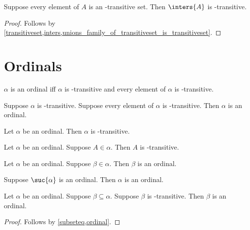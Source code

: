 \begin{proposition}\label{inters_family_of_transitiveset_is_transitiveset}
    Suppose every element of $A$ is an \in-transitive set.
    Then $\inters{A}$ is \in-transitive.
\end{proposition}
\begin{proof}
    Follows by \cref{transitiveset,inters,unions_family_of_transitiveset_is_transitiveset}.
\end{proof}


\section{Ordinals}

\begin{definition}\label{ordinal}
    $\alpha$ is an ordinal iff
    $\alpha$ is \in-transitive and
    every element of $\alpha$ is \in-transitive.
\end{definition}

\begin{proposition}\label{ordinal_intro}
    Suppose $\alpha$ is \in-transitive.
    Suppose every element of $\alpha$ is \in-transitive.
    Then $\alpha$ is an ordinal.
\end{proposition}

\begin{proposition}\label{ordinal_is_transitiveset}
    Let $\alpha$ be an ordinal.
    Then $\alpha$ is \in-transitive.
\end{proposition}

\begin{proposition}\label{ordinal_elem_is_transitiveset}
    Let $\alpha$ be an ordinal.
    Suppose $A\in\alpha$.
    Then $A$ is \in-transitive.
\end{proposition}

\begin{proposition}\label{elem_of_ordinal_is_ordinal}
    Let $\alpha$ be an ordinal.
    Suppose $\beta\in\alpha$.
    Then $\beta$ is an ordinal.
\end{proposition}

\begin{proposition}\label{suc_ordinal_implies_ordinal}
    Suppose $\suc{\alpha}$ is an ordinal.
    Then $\alpha$ is an ordinal.
\end{proposition}

\begin{proposition}\label{transitivesubseteq_of_ordinal_is_ordinal}
    Let $\alpha$ be an ordinal.
    Suppose $\beta\subseteq\alpha$.
    Suppose $\beta$ is \in-transitive.
    Then $\beta$ is an ordinal.
\end{proposition}
\begin{proof}
    Follows by \cref{subseteq,ordinal}.
\end{proof}

